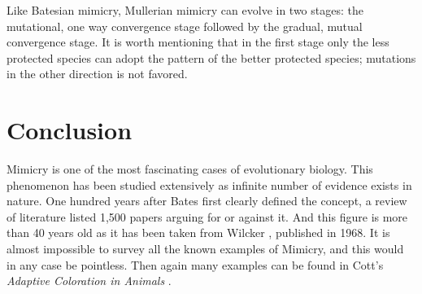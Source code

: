 Like Batesian mimicry, Mullerian mimicry can evolve in two stages: the mutational, one way convergence stage followed by the gradual, mutual convergence stage. It is worth mentioning that in the first stage only the less protected species can adopt the pattern of the better protected species; mutations in the other direction is not favored.

\section{Conclusion}
Mimicry is one of the most fascinating cases of evolutionary biology. This phenomenon has been studied extensively as infinite number of evidence exists in nature. One hundred years after Bates first clearly defined the concept, a review of literature listed 1,500 papers arguing for or against it. And this figure is more than 40 years old as it has been taken from Wilcker \cite{wickler1986}, published in 1968. It is almost impossible to survey all the known examples of Mimicry, and this would in any case be pointless. Then again many examples can be found in Cott's \textit{Adaptive Coloration in Animals} \cite{cott1957}.


